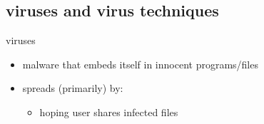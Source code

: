 \subsection{viruses and virus techniques}

\begin{frame}{viruses}
    \begin{itemize}
    \item malware that embeds itself in innocent programs/files
    \item spreads (primarily) by:
        \begin{itemize}
        \item hoping user shares infected files
        \end{itemize}
    \end{itemize}
\end{frame}

